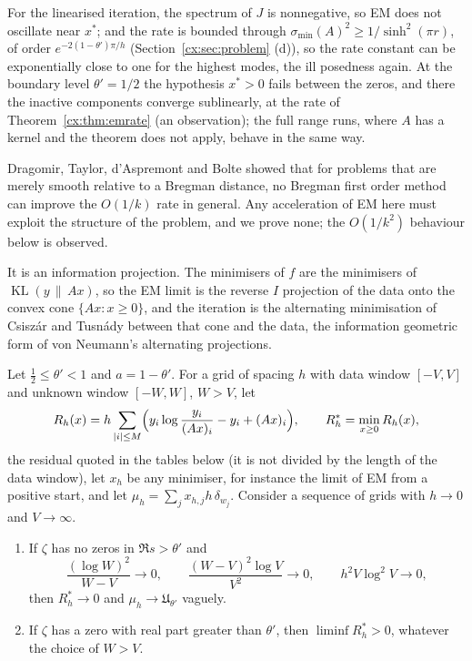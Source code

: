 For the linearised iteration, the spectrum of $J$ is nonnegative, so EM does not oscillate near $x^*$; and the rate is bounded through $\sigma_{\min}(A)^2\ge1/\sinh^2(\pi r)$, of order $e^{-2(1-\theta')\pi/h}$ (Section~\ref{cx:sec:problem} (d)), so the rate constant can be exponentially close to one for the highest modes, the ill posedness again. At the boundary level $\theta'=1/2$ the hypothesis $x^*>0$ fails between the zeros, and there the inactive components converge sublinearly, at the rate of Theorem~\ref{cx:thm:emrate} (an observation); the full range runs, where $A$ has a kernel and the theorem does not apply, behave in the same way.

\begin{remark}
Dragomir, Taylor, d'Aspremont and Bolte \cite{DTAB22} showed that for problems that are merely smooth relative to a Bregman distance, no Bregman first order method can improve the $O(1/k)$ rate in general. Any acceleration of EM here must exploit the structure of the problem, and we prove none; the $O(1/k^2)$ behaviour below is observed.
\end{remark}

It is an information projection. The minimisers of $f$ are the minimisers of $\operatorname{KL}(y\,\|\,Ax)$, so the EM limit is the reverse $I$ projection of the data onto the convex cone $\{Ax:x\ge0\}$, and the iteration is the alternating minimisation of Csisz\'ar and Tusn\'ady \cite{CT84} between that cone and the data, the information geometric form of von Neumann's alternating projections.

\begin{proposition}\label{cx:prop:what}
Let $\tfrac12\le\theta'<1$ and $a=1-\theta'$. For a grid of spacing $h$ with data window $[-V,V]$ and unknown window $[-W,W]$, $W>V$, let
\[
R_h(x)=h\sum_{|i|\le M}\Bigl(y_i\log\frac{y_i}{(Ax)_i}-y_i+(Ax)_i\Bigr),\qquad R_h^*=\min_{x\ge0}R_h(x),
\]
the residual quoted in the tables below (it is not divided by the length of the data window), let $x_h$ be any minimiser, for instance the limit of EM from a positive start, and let $\mu_h=\sum_jx_{h,j}h\,\delta_{w_j}$. Consider a sequence of grids with $h\to0$ and $V\to\infty$.
\begin{enumerate}
\item[(a)] If $\zeta$ has no zeros in $\Re s>\theta'$ and
\[
\frac{(\log W)^2}{W-V}\to0,\qquad\frac{(W-V)^2\log V}{V^2}\to0,\qquad h^2V\log^2V\to0,
\]
then $R_h^*\to0$ and $\mu_h\to\mathfrak U_{\theta'}$ vaguely.
\item[(b)] If $\zeta$ has a zero with real part greater than $\theta'$, then $\liminf R_h^*>0$, whatever the choice of $W>V$.
\end{enumerate}
\end{proposition}

